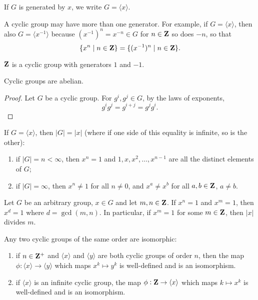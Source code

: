 \begin{notation}
If $G$ is generated by $x$, we write $G=\langle x\rangle$.
\end{notation}

\begin{remark}
A cyclic group may have more than one generator. For example, if $G=\langle x\rangle$, then also $G=\langle x^{-1}\rangle$ because $(x^{-1})^n=x^{-n}\in G$ for $n\in\mathbf Z$ so does $-n$, so that
\[\{x^n\mid n\in\mathbf Z\}=\{(x^{-1})^n\mid n\in\mathbf Z\}.\] 
\end{remark}

\begin{example}
$\mathbf Z$ is a cyclic group with generators $1$ and $-1$.
\end{example}

\begin{proposition}
Cyclic groups are abelian.
\end{proposition}

\begin{proof}
Let $G$ be a cyclic group. For $g^i,g^j\in G$, by the laws of exponents,
\[g^i g^j=g^{i+j}=g^j g^i.\]
\end{proof}

\begin{proposition}
If $G=\langle x\rangle$, then $|G|=|x|$ (where if one side of this equality is infinite, so is the other):
\begin{enumerate}[label=(\roman*)]
\item if $|G|=n<\infty$, then $x^n=1$ and $1,x,x^2,\dots,x^{n-1}$ are all the distinct elements of $G$;
\item if $|G|=\infty$, then $x^n\neq1$ for all $n\neq0$, and $x^a\neq x^b$ for all $a,b\in\mathbf Z$, $a\neq b$.
\end{enumerate}
\end{proposition}

\begin{proposition}
Let $G$ be an arbitrary group, $x\in G$ and let $m,n\in\mathbf Z$. If $x^n=1$ and $x^m=1$, then $x^d=1$ where $d=\gcd(m,n)$. In particular, if $x^m=1$ for some $m\in\mathbf Z$, then $|x|$ divides $m$.
\end{proposition}

\begin{theorem}
Any two cyclic groups of the same order are isomorphic:
\begin{enumerate}[label=(\roman*)]
\item if $n\in\mathbf Z^+$ and $\langle x\rangle$ and $\langle y\rangle$ are both cyclic groups of order $n$, then the map $\phi:\langle x\rangle\to\langle y\rangle$ which maps $x^k\mapsto y^k$ is well-defined and is an isomorphism.
\item if $\langle x\rangle$ is an infinite cyclic group, the map $\phi:\mathbf Z\to\langle x\rangle$ which maps $k\mapsto x^k$ is well-defined and is an isomorphism.
\end{enumerate}
\end{theorem}

